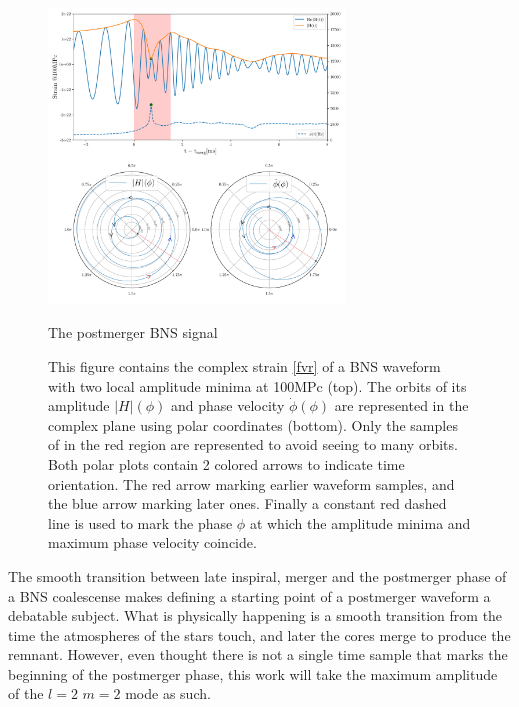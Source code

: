 \begin{figure}[hbt!]
\begin{center}
\includegraphics[width=0.7\textwidth, angle=0]{images/Data_analysis/results/postm_wf.pdf}
\end{center}
\captionsetup{width=0.8\textwidth}
\caption{The postmerger BNS signal}
\caption*{This figure contains the complex strain \ref{fvr} of a BNS waveform \cite{Dietrich:2018phi} with two local amplitude minima at 100MPc (top). The orbits of its amplitude $|H|(\phi)$ and phase velocity $\dot{\phi}(\phi)$ are represented in  the complex plane using polar coordinates (bottom). Only the samples of in the red region are represented to avoid seeing to many orbits.
Both polar plots contain 2 colored arrows to indicate time orientation. The red arrow marking earlier waveform samples, and the blue arrow marking later ones. Finally a constant red dashed line is used to mark the phase $\phi$ at which the amplitude minima and maximum phase velocity coincide.}
\label{fig:9} 
\end{figure}

\FloatBarrier

The smooth transition between late inspiral, merger and the postmerger phase of a BNS coalescense makes defining a starting point of a postmerger waveform a debatable subject. What is physically happening is a smooth transition from the time the atmospheres of the stars touch, and later the cores merge to produce the remnant. However, even thought there is not a single time sample that marks the beginning of the postmerger phase, this work will take the maximum amplitude of the $l=2$ $m=2$ mode as such. 

